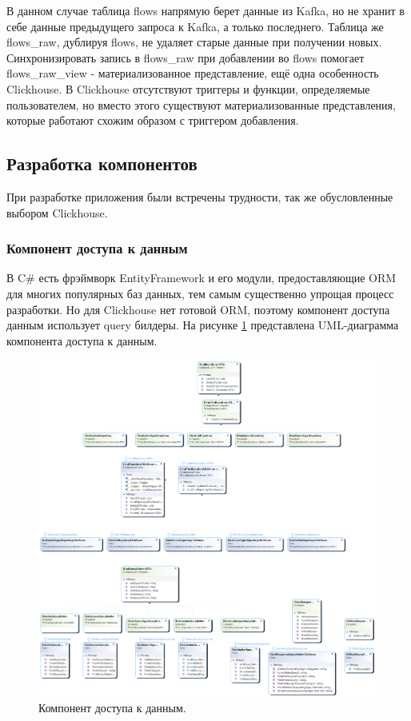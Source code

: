 В данном случае таблица flows напрямую берет данные из Kafka, но не хранит в себе данные предыдущего запроса к Kafka, а только последнего. Таблица же flows\_raw, дублируя flows, не удаляет старые данные при получении новых. Синхронизировать запись в flows\_raw при добавлении во flows помогает flows\_raw\_view - материализованное представление, ещё одна особенность Clickhouse. В Clickhouse отсутствуют триггеры и функции, определяемые пользователем, но вместо этого существуют материализованные представления, которые работают схожим образом с триггером добавления.
\subsection{Разработка компонентов}
При разработке приложения были встречены трудности, так же обусловленные выбором Clickhouse.
\subsubsection{Компонент доступа к данным}
В C\# есть фрэймворк EntityFramework и его модули, предоставляющие ORM для многих популярных баз данных, тем самым существенно упрощая процесс разработки. Но для Clickhouse нет готовой ORM, поэтому компонент доступа данным использует query билдеры.
На рисунке \ref{img:AccessToDB} представлена UML-диаграмма компонента доступа к данным.
\begin{figure}[H]
	\centering
	\includegraphics[scale=0.35]{AccessToDB.png}
	\caption{Компонент доступа к данным.}
	\label{img:AccessToDB}
\end{figure}
